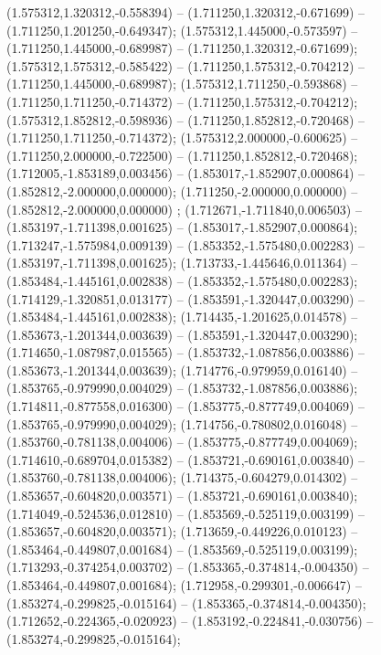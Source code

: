  (1.575312,1.320312,-0.558394) -- (1.711250,1.320312,-0.671699) -- (1.711250,1.201250,-0.649347);
 (1.575312,1.445000,-0.573597) -- (1.711250,1.445000,-0.689987) -- (1.711250,1.320312,-0.671699);
 (1.575312,1.575312,-0.585422) -- (1.711250,1.575312,-0.704212) -- (1.711250,1.445000,-0.689987);
 (1.575312,1.711250,-0.593868) -- (1.711250,1.711250,-0.714372) -- (1.711250,1.575312,-0.704212);
 (1.575312,1.852812,-0.598936) -- (1.711250,1.852812,-0.720468) -- (1.711250,1.711250,-0.714372);
 (1.575312,2.000000,-0.600625) -- (1.711250,2.000000,-0.722500) -- (1.711250,1.852812,-0.720468);
 (1.712005,-1.853189,0.003456) -- (1.853017,-1.852907,0.000864) -- (1.852812,-2.000000,0.000000);
 (1.711250,-2.000000,0.000000) -- (1.852812,-2.000000,0.000000) ;
 (1.712671,-1.711840,0.006503) -- (1.853197,-1.711398,0.001625) -- (1.853017,-1.852907,0.000864);
 (1.713247,-1.575984,0.009139) -- (1.853352,-1.575480,0.002283) -- (1.853197,-1.711398,0.001625);
 (1.713733,-1.445646,0.011364) -- (1.853484,-1.445161,0.002838) -- (1.853352,-1.575480,0.002283);
 (1.714129,-1.320851,0.013177) -- (1.853591,-1.320447,0.003290) -- (1.853484,-1.445161,0.002838);
 (1.714435,-1.201625,0.014578) -- (1.853673,-1.201344,0.003639) -- (1.853591,-1.320447,0.003290);
 (1.714650,-1.087987,0.015565) -- (1.853732,-1.087856,0.003886) -- (1.853673,-1.201344,0.003639);
 (1.714776,-0.979959,0.016140) -- (1.853765,-0.979990,0.004029) -- (1.853732,-1.087856,0.003886);
 (1.714811,-0.877558,0.016300) -- (1.853775,-0.877749,0.004069) -- (1.853765,-0.979990,0.004029);
 (1.714756,-0.780802,0.016048) -- (1.853760,-0.781138,0.004006) -- (1.853775,-0.877749,0.004069);
 (1.714610,-0.689704,0.015382) -- (1.853721,-0.690161,0.003840) -- (1.853760,-0.781138,0.004006);
 (1.714375,-0.604279,0.014302) -- (1.853657,-0.604820,0.003571) -- (1.853721,-0.690161,0.003840);
 (1.714049,-0.524536,0.012810) -- (1.853569,-0.525119,0.003199) -- (1.853657,-0.604820,0.003571);
 (1.713659,-0.449226,0.010123) -- (1.853464,-0.449807,0.001684) -- (1.853569,-0.525119,0.003199);
 (1.713293,-0.374254,0.003702) -- (1.853365,-0.374814,-0.004350) -- (1.853464,-0.449807,0.001684);
 (1.712958,-0.299301,-0.006647) -- (1.853274,-0.299825,-0.015164) -- (1.853365,-0.374814,-0.004350);
 (1.712652,-0.224365,-0.020923) -- (1.853192,-0.224841,-0.030756) -- (1.853274,-0.299825,-0.015164);
